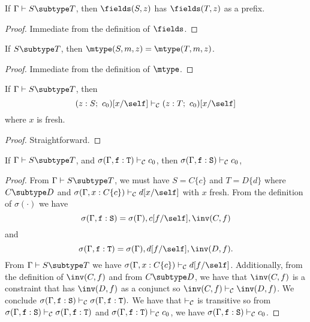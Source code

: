 \begin{lemma}
\label{lemmaone} %
If   $\Gamma \vdash S \subtype T$,
then $\fields(S,z)$ has $\fields(T,z)$ as a prefix.
\end{lemma}

\begin{proof}
Immediate from the definition of $\fields$.
\end{proof}

\begin{lemma}
\label{lemmatwo} %
If   $S \subtype T$,
then $\mtype(S,m,z) = \mtype(T,m,z)$.
\end{lemma}

\begin{proof}
Immediate from the definition of $\mtype$.
\end{proof}

\begin{lemma}
\label{existential-subtyping}
If   $\Gamma \vdash S \subtype T$,
then $$(z:S;~c_0)[x/\self] \vdash_{\cal C} (z:T;~c_0)[x/\self]$$
where $x$ is fresh.
\end{lemma}

\begin{proof}
Straightforward.
\end{proof}

\begin{lemma}
\label{lemmafour} %
If   $\Gamma \vdash S \subtype T$,
and  $\sigma(\Gamma,{\tt f}: {\tt T}) \vdash_{\cal C} c_0$,
then $\sigma(\Gamma,{\tt f}: {\tt S}) \vdash_{\cal C} c_0$,
\end{lemma}

\begin{proof}
From $\Gamma \vdash S \subtype T$,
we must have $S = C\{c\}$ and $T = D\{d\}$
where
$C \subtype D$
and
$\sigma(\Gamma, x: C\{c\}) \vdash_{\cal C} d[x/\self]$
with $x$ fresh.
From the definition of $\sigma(\cdot)$ we have
    $$\sigma(\Gamma,{\tt f}: {\tt S}) = \sigma(\Gamma), c[f/\self], \inv(C,f)$$ and $$\sigma(\Gamma,{\tt f}: {\tt T}) = \sigma(\Gamma), d[f/\self], \inv(D,f).$$
From $\Gamma \vdash S \subtype T$ we have 
$\sigma(\Gamma, x: C\{c\}) \vdash_{\cal C} d[f/\self]$.
Additionally, from the definition of $\inv(C,f)$ and
from $C \subtype D$, 
we have that $\inv(C,f)$ is a constraint that has $\inv(D,f)$ as a conjunct so 
$\inv(C,f) \vdash_{\cal C} \inv(D,f)$.
We conclude
$\sigma(\Gamma,{\tt f}: {\tt S}) \vdash_{\cal C}
\sigma(\Gamma,{\tt f}: {\tt T}).$
We have that $\vdash_{\cal C}$ is transitive so 
from $\sigma(\Gamma,{\tt f}: {\tt S}) \vdash_{\cal C}
\sigma(\Gamma,{\tt f}: {\tt T})$
and
$\sigma(\Gamma,{\tt f}: {\tt T}) \vdash_{\cal C} c_0$,
we have 
$\sigma(\Gamma,{\tt f}: {\tt S}) \vdash_{\cal C} c_0$.
\end{proof}

